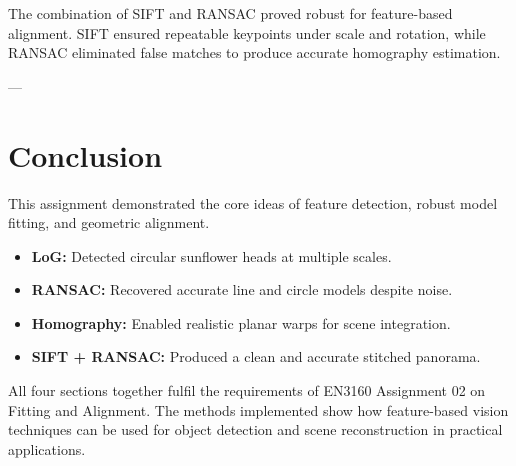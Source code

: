 \documentclass[11pt,a4paper]{article}
\begin{document}
The combination of SIFT and RANSAC proved robust for feature-based alignment. SIFT ensured repeatable keypoints under scale and rotation, while RANSAC eliminated false matches to produce accurate homography estimation.

---

\section*{Conclusion}
This assignment demonstrated the core ideas of feature detection, robust model fitting, and geometric alignment.

\begin{itemize}
\item \textbf{LoG:} Detected circular sunflower heads at multiple scales.  
\item \textbf{RANSAC:} Recovered accurate line and circle models despite noise.  
\item \textbf{Homography:} Enabled realistic planar warps for scene integration.  
\item \textbf{SIFT + RANSAC:} Produced a clean and accurate stitched panorama.
\end{itemize}

All four sections together fulfil the requirements of EN3160 Assignment 02 on Fitting and Alignment.  
The methods implemented show how feature-based vision techniques can be used for object detection and scene reconstruction in practical applications.
\end{document}
